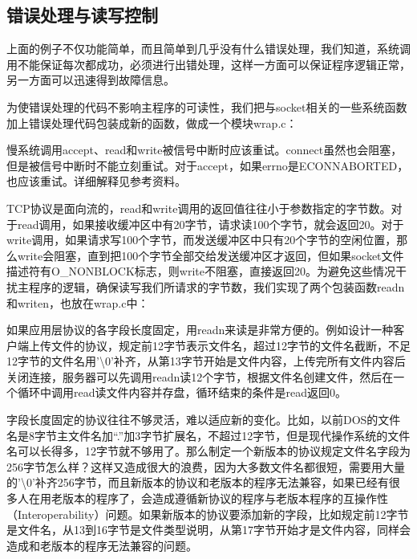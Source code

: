 \subsection{错误处理与读写控制}
%


上面的例子不仅功能简单，而且简单到几乎没有什么错误处理，我们知道，系统调用不能保证每次都成功，必须进行出错处理，这样一方面可以保证程序逻辑正常，另一方面可以迅速得到故障信息。



为使错误处理的代码不影响主程序的可读性，我们把与socket相关的一些系统函数加上错误处理代码包装成新的函数，做成一个模块wrap.\BookSplit{}c：




慢系统调用accept、read和write被信号中断时应该重试。connect虽然也会阻塞，但是被信号中断时不能立刻重试。对于accept，如果errno是ECONNABORTED，也应该重试。详细解释见参考资料。



TCP协议是面向流的，read和write调用的返回值往往小于参数指定的字节数。对于read调用，如果接收缓冲区中有20字节，请求读100个字节，就会返回20。对于write调用，如果请求写100个字节，而发送缓冲区中只有20个字节的空闲位置，那么write会阻塞，直到把100个字节全部交给发送缓冲区才返回，但如果socket文件描述符有O\_\BookSplit{}NONBLOCK标志，则write不阻塞，直接返回20。为避免这些情况干扰主程序的逻辑，确保读写我们所请求的字节数，我们实现了两个包装函数readn和writen，也放在wrap.\BookSplit{}c中：




如果应用层协议的各字段长度固定，用readn来读是非常方便的。例如设计一种客户端上传文件的协议，规定前12字节表示文件名，超过12字节的文件名截断，不足12字节的文件名用'\textbackslash{}0'补齐，从第13字节开始是文件内容，上传完所有文件内容后关闭连接，服务器可以先调用readn读12个字节，根据文件名创建文件，然后在一个循环中调用read读文件内容并存盘，循环结束的条件是read返回0。



字段长度固定的协议往往不够灵活，难以适应新的变化。比如，以前DOS的文件名是8字节主文件名加“.”加3字节扩展名，不超过12字节，但是现代操作系统的文件名可以长得多，12字节就不够用了。那么制定一个新版本的协议规定文件名字段为256字节怎么样？这样又造成很大的浪费，因为大多数文件名都很短，需要用大量的'\textbackslash{}0'补齐256字节，而且新版本的协议和老版本的程序无法兼容，如果已经有很多人在用老版本的程序了，会造成遵循新协议的程序与老版本程序的互操作性（Interoperability）问题。如果新版本的协议要添加新的字段，比如规定前12字节是文件名，从13到16字节是文件类型说明，从第17字节开始才是文件内容，同样会造成和老版本的程序无法兼容的问题。



